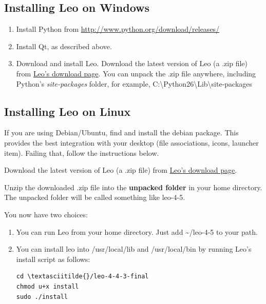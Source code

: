 \documentclass[a4paper,10pt,english]{sphinxmanual}
\begin{document}
\subsection{Installing Leo on Windows}
\label{installing:installing-leo-on-windows}\begin{enumerate}
\item {} 
Install Python from \href{http://www.python.org/download/releases/}{http://www.python.org/download/releases/}

\item {} 
Install Qt, as described above.

\item {} 
Download and install Leo.
Download the latest version of Leo (a .zip file) from \href{http://sourceforge.net/project/showfiles.php?group\_id=3458\&package\_id=29106}{Leo's download page}.
You can unpack the .zip file anywhere, including Python's \emph{site-packages} folder,
for example, C:\textbackslash{}Python26\textbackslash{}Lib\textbackslash{}site-packages

\end{enumerate}


\subsection{Installing Leo on Linux}
\label{installing:installing-leo-on-linux}
If you are using Debian/Ubuntu, find and install the debian package. This
provides the best integration with your desktop (file associations, icons, launcher
item). Failing that, follow the instructions below.

Download the latest version of Leo (a .zip file) from \href{http://sourceforge.net/project/showfiles.php?group\_id=3458\&package\_id=29106}{Leo's download page}.

Unzip the downloaded .zip file into the \textbf{unpacked folder} in your home directory.
The unpacked folder will be called something like leo-4-5.

You now have two choices:
\begin{enumerate}
\item {} 
You can run Leo from your home directory.
Just add  \textasciitilde{}/leo-4-5 to your path.

\item {} 
You can install leo into /usr/local/lib and /usr/local/bin by running Leo's install script as follows:

\begin{Verbatim}[commandchars=\\\{\}]
cd \textasciitilde{}/leo-4-4-3-final
chmod u+x install
sudo ./install
\end{Verbatim}

\end{enumerate}
\end{document}
